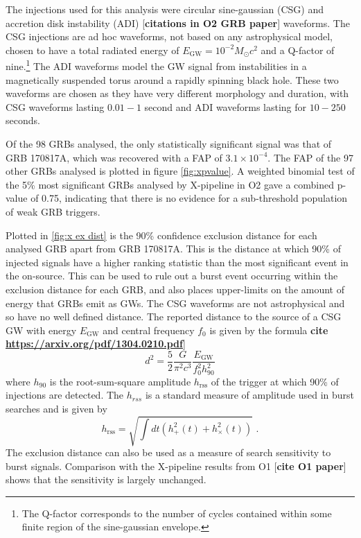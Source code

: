 \documentclass[11pt]{cuthesis}
\newcommand{\fs}{\text{ .}}
\newcommand{\xp}{X-pipeline }
\begin{document}
The injections used for this analysis were circular sine-gaussian (CSG) and accretion disk instability (ADI) [\textbf{citations in O2 GRB paper}] waveforms. The CSG injections are ad hoc waveforms, not based on any astrophysical model, chosen to have a total radiated energy of $E_\text{GW} = 10^{-2}M_\odot c^2$ and a Q-factor of nine.\footnote{The Q-factor corresponds to the number of cycles contained within some finite region of the sine-gaussian envelope.} The ADI waveforms model the GW signal from instabilities in a magnetically suspended torus around a rapidly spinning black hole. These two waveforms are chosen as they have very different morphology and duration, with CSG waveforms lasting $0.01 - 1$ second and ADI waveforms lasting for $10 - 250$ seconds.

Of the 98 GRBs analysed, the only statistically significant signal was that of GRB 170817A, which was recovered with a FAP of $3.1\times 10^{-4}$. The FAP of the 97 other GRBs analysed is plotted in figure \ref{fig:xpvalue}. A weighted binomial test of the 5\% most significant GRBs analysed by \xp in O2 gave a combined p-value of 0.75, indicating that there is no evidence for a sub-threshold population of weak GRB triggers. 

Plotted in \ref{fig:x ex dist} is the 90\% confidence exclusion distance for each analysed GRB apart from GRB 170817A. This is the distance at which 90\% of injected signals have a higher ranking statistic than the most significant event in the on-source. This can be used to rule out a burst event occurring within the exclusion distance for each GRB, and also places upper-limits on the amount of energy that GRBs emit as GWs. The CSG waveforms are not astrophysical and so have no well defined distance. The reported distance to the source of a CSG GW with energy $E_\text{GW}$ and central frequency $f_0$ is given by the formula \textbf{cite \url{https://arxiv.org/pdf/1304.0210.pdf}}]
\begin{equation}
d^2 = \frac{5}{2}\frac{G}{\pi^2 c^3}\frac{E_\text{GW}}{f_0^2 h_\text{90}^2 }  
\end{equation}
where $h_\text{90}$ is the root-sum-square amplitude $h_\text{rss}$ of the trigger at which 90\% of injections are detected. The $h_{rss}$ is a standard measure of amplitude used in burst searches and is given by
\begin{equation}
h_\text{rss} = \sqrt{\int dt (h_+^2(t) + h_\times^2(t))} \fs
\end{equation}
The exclusion distance can also be used as a measure of search sensitivity to burst signals. Comparison with the \xp results from O1 [\textbf{cite O1 paper}] shows that the sensitivity is largely unchanged. 
\end{document}
